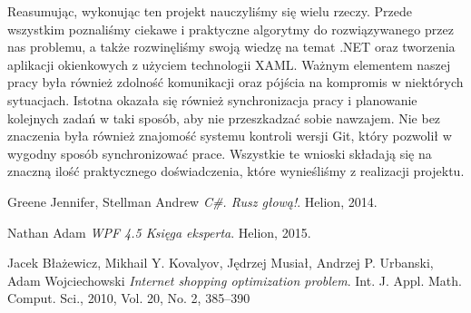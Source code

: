 \documentclass[a4paper]{article}
\begin{document}
Reasumując, wykonując ten projekt nauczyliśmy się wielu rzeczy. Przede wszystkim poznaliśmy ciekawe i praktyczne algorytmy do rozwiązywanego przez nas problemu, a także rozwinęliśmy swoją wiedzę na temat .NET oraz tworzenia aplikacji okienkowych z użyciem technologii XAML. Ważnym elementem naszej pracy była również zdolność komunikacji oraz pójścia na kompromis w niektórych sytuacjach. Istotna okazała się również synchronizacja pracy i planowanie kolejnych zadań w taki sposób, aby nie przeszkadzać sobie nawzajem. Nie bez znaczenia była również znajomość systemu kontroli wersji Git, który pozwolił w wygodny sposób synchronizować prace. Wszystkie te wnioski składają się na znaczną ilość praktycznego doświadczenia, które wynieśliśmy z realizacji projektu. 
\begin{thebibliography}{9}

  Greene Jennifer, Stellman Andrew 
  \emph{C\#. Rusz głową!}.
  Helion,
  2014.
  
	Nathan Adam
	\emph{WPF 4.5 Księga eksperta}. Helion, 2015.  
  
	Jacek Błażewicz, Mikhail Y. Kovalyov, Jędrzej Musiał, Andrzej P. Urbanski, Adam Wojciechowski
	\emph{Internet shopping optimization problem}.
	Int. J. Appl. Math. Comput. Sci., 2010, Vol. 20, No. 2, 385–390 
	
  \end{thebibliography}
\end{document}
